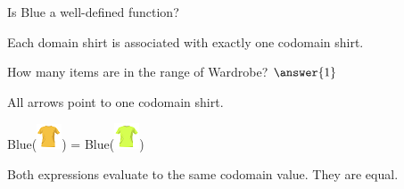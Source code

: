 \documentclass{ximera}
\begin{document}
\begin{exercise}
Is Blue a well-defined function?
  \begin{multipleChoice}
  \end{multipleChoice}
  \begin{feedback}
Each domain shirt is associated with exactly one codomain shirt.
  \end{feedback}
\end{exercise}





\begin{exercise}
How many items are in the range of Wardrobe? $\answer{1}$
  \begin{feedback}
All arrows point to one codomain shirt.
  \end{feedback}
\end{exercise}







\begin{exercise}
 Blue({\includegraphics[width=28px,height=28px]{pics/elements/shirts/shirts2.png}}) = Blue({\includegraphics[width=28px,height=29px]{pics/elements/shirts/shirts4.png}}) 
  \begin{multipleChoice}
  \end{multipleChoice}
  \begin{feedback}
Both expressions evaluate to the same codomain value.  They are equal.
  \end{feedback}
\end{exercise}
\end{document}
